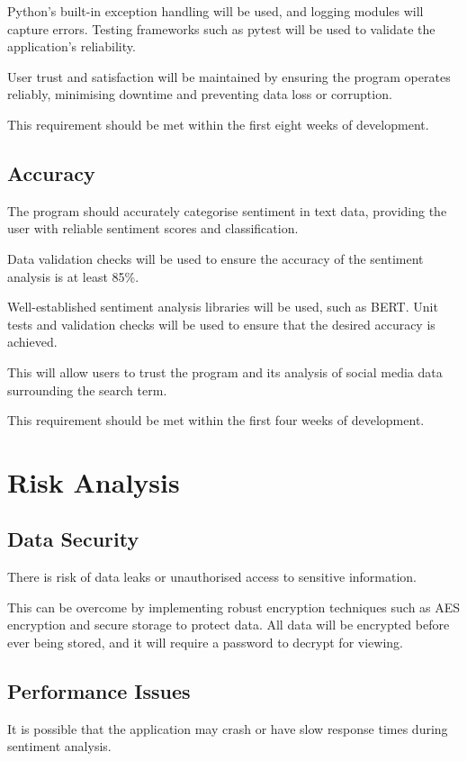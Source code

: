     Python's built-in exception handling will be used, and logging modules will capture errors. Testing frameworks such as pytest will be used to validate the application's reliability.

    User trust and satisfaction will be maintained by ensuring the program operates reliably, minimising downtime and preventing data loss or corruption.

    This requirement should be met within the first eight weeks of development.

    \subsection{Accuracy}
    The program should accurately categorise sentiment in text data, providing the user with reliable sentiment scores and classification.

    Data validation checks will be used to ensure the accuracy of the sentiment analysis is at least 85\%.

    Well-established sentiment analysis libraries will be used, such as BERT. Unit tests and validation checks will be used to ensure that the desired accuracy is achieved.

    This will allow users to trust the program and its analysis of social media data surrounding the search term.

    This requirement should be met within the first four weeks of development.

\section{Risk Analysis}

    \subsection{Data Security}
    There is risk of data leaks or unauthorised access to sensitive information.

    This can be overcome by implementing robust encryption techniques such as AES encryption and secure storage to protect data. All data will be encrypted before ever being stored, and it will require a password to decrypt for viewing.

    \subsection{Performance Issues}
    It is possible that the application may crash or have slow response times during sentiment analysis.

